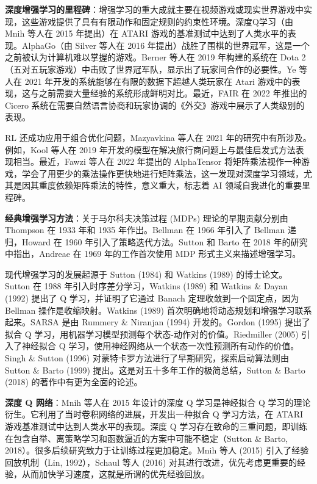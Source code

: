 \textbf{深度增强学习的里程碑}：增强学习的重大成就主要在视频游戏或现实世界游戏中实现，这些游戏提供了具有有限动作和固定规则的约束性环境。深度Q学习（由 Mnih 等人在 2015 年提出）在 ATARI 游戏的基准测试中达到了人类水平的表现。AlphaGo（由 Silver 等人在 2016 年提出）战胜了围棋的世界冠军，这是一个之前被认为计算机难以掌握的游戏。Berner 等人在 2019 年构建的系统在 Dota 2（五对五玩家游戏）中击败了世界冠军队，显示出了玩家间合作的必要性。Ye 等人在 2021 年开发的系统能够在有限的数据下超越人类玩家在 Atari 游戏中的表现，这与之前需要大量经验的系统形成鲜明对比。最近，FAIR 在 2022 年推出的 Cicero 系统在需要自然语言协商和玩家协调的《外交》游戏中展示了人类级别的表现。

RL 还成功应用于组合优化问题，Mazyavkina 等人在 2021 年的研究中有所涉及。例如，Kool 等人在 2019 年开发的模型在解决旅行商问题上与最佳启发式方法表现相当。最近，Fawzi 等人在 2022 年提出的 AlphaTensor 将矩阵乘法视作一种游戏，学会了用更少的乘法操作更快地进行矩阵乘法，这一发现对深度学习领域，尤其是因其重度依赖矩阵乘法的特性，意义重大，标志着 AI 领域自我进化的重要里程碑。

\textbf{经典增强学习方法}：关于马尔科夫决策过程 (MDPs) 理论的早期贡献分别由 Thompson 在 1933 年和 1935 年作出。Bellman 在 1966 年引入了 Bellman 递归，Howard 在 1960 年引入了策略迭代方法。Sutton 和 Barto 在 2018 年的研究中指出，Andreae 在 1969 年的工作首次使用 MDP 形式主义来描述增强学习。

现代增强学习的发展起源于 Sutton (1984) 和 Watkins (1989) 的博士论文。Sutton 在 1988 年引入时序差分学习，Watkins (1989) 和 Watkins \& Dayan (1992) 提出了 Q 学习，并证明了它通过 Banach 定理收敛到一个固定点，因为 Bellman 操作是收缩映射。Watkins (1989) 首次明确地将动态规划和增强学习联系起来。SARSA 是由 Rummery \& Niranjan (1994) 开发的。Gordon (1995) 提出了拟合 Q 学习，用机器学习模型预测每个状态-动作对的价值。Riedmiller (2005) 引入了神经拟合 Q 学习，使用神经网络从一个状态一次性预测所有动作的价值。Singh \& Sutton (1996) 对蒙特卡罗方法进行了早期研究，探索启动算法则由 Sutton \& Barto (1999) 提出。这是对五十多年工作的极简总结，Sutton \& Barto (2018) 的著作中有更为全面的论述。

\textbf{深度 Q 网络}：Mnih 等人在 2015 年设计的深度 Q 学习是神经拟合 Q 学习的理论衍生。它利用了当时卷积网络的进展，开发出一种拟合 Q 学习方法，在 ATARI 游戏基准测试中达到人类水平的表现。深度 Q 学习存在致命的三重问题，即训练在包含自举、离策略学习和函数逼近的方案中可能不稳定（Sutton \& Barto, 2018）。很多后续研究致力于让训练过程更加稳定。Mnih 等人 (2015) 引入了经验回放机制（Lin, 1992），Schaul 等人 (2016) 对其进行改进，优先考虑更重要的经验，从而加快学习速度，这就是所谓的优先经验回放。

